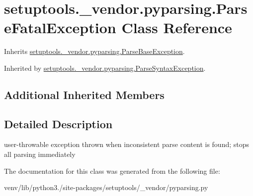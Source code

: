 \hypertarget{classsetuptools_1_1__vendor_1_1pyparsing_1_1_parse_fatal_exception}{}\section{setuptools.\+\_\+vendor.\+pyparsing.\+Parse\+Fatal\+Exception Class Reference}
\label{classsetuptools_1_1__vendor_1_1pyparsing_1_1_parse_fatal_exception}


Inherits \hyperlink{classsetuptools_1_1__vendor_1_1pyparsing_1_1_parse_base_exception}{setuptools.\+\_\+vendor.\+pyparsing.\+Parse\+Base\+Exception}.



Inherited by \hyperlink{classsetuptools_1_1__vendor_1_1pyparsing_1_1_parse_syntax_exception}{setuptools.\+\_\+vendor.\+pyparsing.\+Parse\+Syntax\+Exception}.

\subsection*{Additional Inherited Members}


\subsection{Detailed Description}
\begin{DoxyVerb}user-throwable exception thrown when inconsistent parse content
   is found; stops all parsing immediately\end{DoxyVerb}
 

The documentation for this class was generated from the following file\+:\begin{DoxyCompactItemize}
\item 
venv/lib/python3./site-\/packages/setuptools/\+\_\+vendor/pyparsing.\+py\end{DoxyCompactItemize}
